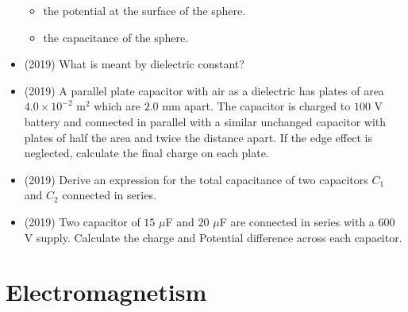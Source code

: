 \documentclass{article}
\begin{document}
\begin{itemize}
\begin{itemize}
\item the potential at the surface of the sphere. 
\item the capacitance of the sphere. 
\end{itemize}
\item (2019)  What is meant by dielectric constant? 
\item (2019)  A parallel plate capacitor with air as a dielectric has plates of area $ 4.0 \times 10^{-2}$ m$ ^{2}$ which are $ 2.0$ mm apart. The capacitor is charged to $ 100$ V battery and connected in parallel with a similar unchanged capacitor with plates of half the area and twice the distance apart. If the edge effect is neglected, calculate the final charge on each plate. 
\item (2019)  Derive an expression for the total capacitance of two capacitors $ C_{1}$ and $ C_{2}$ connected in series. 
\item (2019)  Two capacitor of $ 15$ $\mu$F and $ 20$ $\mu$F are connected in series with a $ 600$ V supply.  Calculate the charge and Potential difference across each capacitor. 
\end{itemize}


\section{Electromagnetism}
\end{document}
